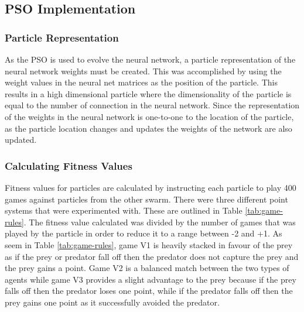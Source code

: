\subsection{PSO Implementation}

\subsubsection{Particle Representation}
As the PSO is used to evolve the neural network, a particle representation of the neural network weights must be created. This was accomplished by using the weight values in the neural net matrices as the position of the particle. This results in a high dimensional particle where the dimensionality of the particle is equal to the number of connection in the neural network. Since the representation of the weights in the neural network is one-to-one to the location of the particle, as the particle location changes and updates the weights of the network are also updated.


\subsubsection{Calculating Fitness Values} \label{sec:calc-fitness}
Fitness values for particles are calculated by instructing each particle to play 400 games against particles from the other swarm. There were three different point systems that were experimented with. These are outlined in Table \ref{tab:game-rules}. The fitness value calculated was divided by the number of games that was played by the particle in order to reduce it to a range between -2 and +1. As seem in Table \ref{tab:game-rules}, game V1 is heavily stacked in favour of the prey as if the prey or predator fall off then the predator does not capture the prey and the prey gains a point. Game V2 is a balanced match between the two types of agents while game V3 provides a slight advantage to the prey because if the prey falls off then the predator loses one point, while if the predator falls off then the prey gains one point as it successfully avoided the predator.

